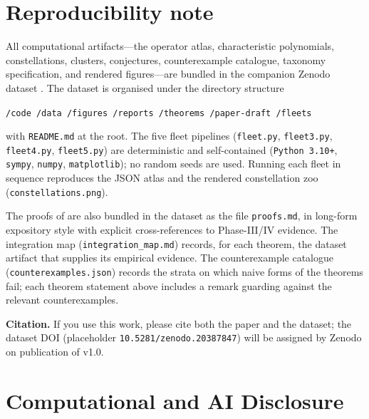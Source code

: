 \documentclass[11pt,a4paper]{article}
\theoremstyle{plain}
\theoremstyle{definition}
\theoremstyle{remark}
\begin{document}
\section{Reproducibility note}\label{sec:reproducibility}

All computational artifacts---the operator atlas, characteristic
polynomials, constellations, clusters, conjectures, counterexample
catalogue, taxonomy specification, and rendered figures---are bundled in
the companion Zenodo dataset \cite{wkb_dataset_v1}. The dataset is
organised under the directory structure
\begin{center}
\texttt{/code\ /data\ /figures\ /reports\ /theorems\ /paper-draft\ /fleets}
\end{center}
with \texttt{README.md} at the root. The five fleet pipelines
(\texttt{fleet.py}, \texttt{fleet3.py}, \texttt{fleet4.py},
\texttt{fleet5.py}) are deterministic and self-contained
(\texttt{Python 3.10+}, \texttt{sympy}, \texttt{numpy},
\texttt{matplotlib}); no random seeds are used. Running each fleet in
sequence reproduces the JSON atlas and the rendered constellation zoo
(\texttt{constellations.png}).

The proofs of 
are also bundled in the dataset as the file \texttt{proofs.md}, in
long-form expository style with explicit cross-references to
Phase-III/IV evidence. The integration map
(\texttt{integration\_map.md}) records, for each theorem, the dataset
artifact that supplies its empirical evidence. The counterexample
catalogue (\texttt{counterexamples.json}) records the strata on which
naive forms of the theorems fail; each theorem statement above includes
a remark guarding against the relevant counterexamples.

\medskip
\noindent\textbf{Citation.} If you use this work, please cite both the
paper and the dataset; the dataset DOI (placeholder
\texttt{10.5281/zenodo.20387847}) will be assigned by Zenodo on
publication of v1.0.

\section*{Computational and AI Disclosure}\label{sec:disclosure}
\end{document}
